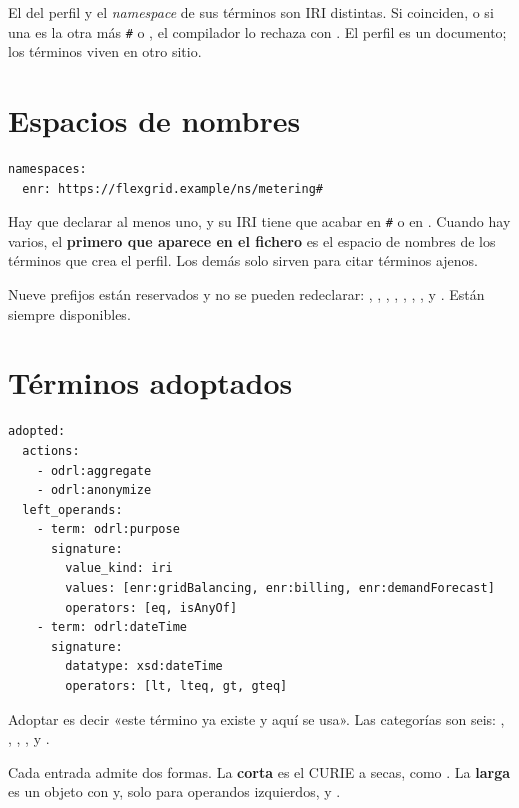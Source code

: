 \begin{trampaHabitual}
El  del perfil y el \emph{namespace} de sus términos son IRI distintas. Si coinciden, o si una es la otra
más \texttt{\#} o \cod{/}, el compilador lo rechaza con . El perfil es un documento; los
términos viven en otro sitio.
\end{trampaHabitual}

\section{Espacios de nombres}

\begin{lstlisting}[style=yaml, firstnumber=16]
namespaces:
  enr: https://flexgrid.example/ns/metering#
\end{lstlisting}

Hay que declarar al menos uno, y su IRI tiene que acabar en \texttt{\#} o en \cod{/}. Cuando hay varios, el
\textbf{primero que aparece en el fichero} es el espacio de nombres de los términos que crea el perfil. Los demás
solo sirven para citar términos ajenos.

Nueve prefijos están reservados y no se pueden redeclarar: , , , , ,
, ,  y . Están siempre disponibles.

\section{Términos adoptados}

\begin{lstlisting}[style=yaml, firstnumber=19]
adopted:
  actions:
    - odrl:aggregate
    - odrl:anonymize
  left_operands:
    - term: odrl:purpose
      signature:
        value_kind: iri
        values: [enr:gridBalancing, enr:billing, enr:demandForecast]
        operators: [eq, isAnyOf]
    - term: odrl:dateTime
      signature:
        datatype: xsd:dateTime
        operators: [lt, lteq, gt, gteq]
\end{lstlisting}

Adoptar es decir «este término ya existe y aquí se usa». Las categorías son seis: ,
, , ,  y .

Cada entrada admite dos formas. La \textbf{corta} es el CURIE a secas, como . La
\textbf{larga} es un objeto con  y, solo para operandos izquierdos,  y .

